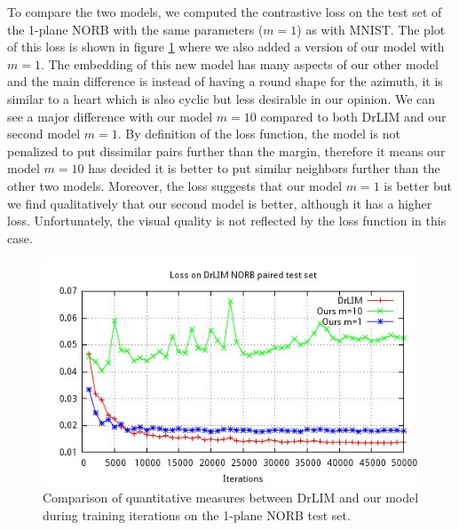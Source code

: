 \documentclass[a4paper,12pt]{report}
\begin{document}
To compare the two models, we computed the contrastive loss on the test set of the 1-plane NORB with the same parameters ($m=1$) as with MNIST.
The plot of this loss is shown in figure \ref{fig:loss_norb_test_common} where we also added a version of our model with $m=1$.
The embedding of this new model has many aspects of our other model and the main difference is instead of having a round shape for the azimuth, it is similar to a heart which is also cyclic but less desirable in our opinion.
We can see a major difference with our model $m=10$ compared to both DrLIM and our second model $m=1$.
By definition of the loss function, the model is not penalized to put dissimilar pairs further than the margin, therefore it means our model $m=10$ has decided it is better to put similar neighbors further than the other two models.
Moreover, the loss suggests that our model $m=1$ is better but we find qualitatively that our second model is better, although it has a higher loss.
Unfortunately, the visual quality is not reflected by the loss function in this case.

\begin{figure}[h]
    \begin{center}
        \includegraphics{thesis_figures/final_loss_testv3.jpg}
    \end{center}
    \caption{Comparison of quantitative measures between DrLIM and our model during training iterations on the 1-plane NORB test set.}
    \label{fig:loss_norb_test_common}
\end{figure}
\end{document}
